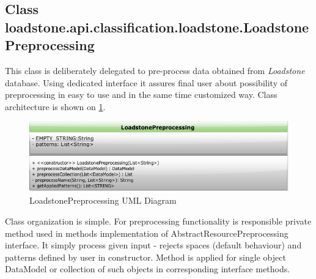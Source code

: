 \subsection{Class \newline loadstone.api.classification.loadstone.\newline LoadstonePreprocessing}
This class is deliberately delegated to pre-process data obtained from \textit{Loadstone} database. Using dedicated interface it assures final user about possibility of preprocessing in easy to use and in the same time customized way. Class architecture is shown on \ref{fig:@=LoadstonePreprocessing}.
\begin{figure}[h]
	\centering
	\includegraphics[scale=0.5]{LoadstonePreprocessing.png}
	\caption{LoadstonePreprocessing UML Diagram}
	\label{fig:@=LoadstonePreprocessing}
\end{figure}
Class organization is simple. For preprocessing functionality is responsible private method used in methods implementation of AbstractResourcePreprocessing interface. It simply process given input - rejects spaces (default behaviour) and patterns defined by user in constructor. Method is applied for single object DataModel or collection of such objects in corresponding interface methods.
